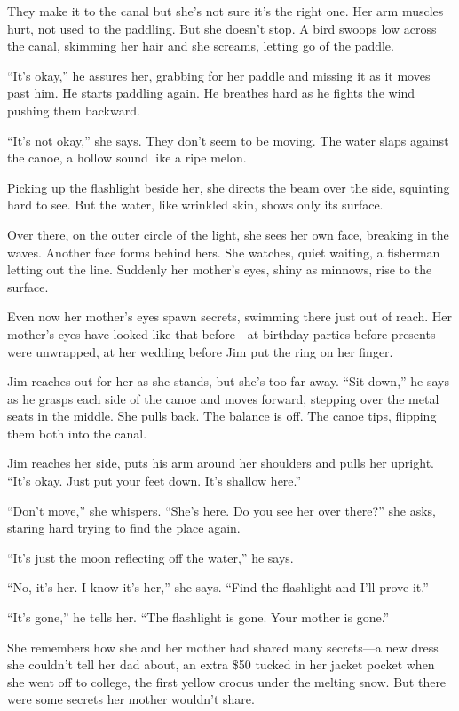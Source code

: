 \documentclass[twoside,10pt]{book}
\begin{document}
They make it to the canal but she's not sure it's the right one. Her arm
muscles hurt, not used to the paddling. But she doesn't stop. A bird
swoops low across the canal, skimming her hair and she screams, letting
go of the paddle.

``It's okay,'' he assures her, grabbing for her paddle and missing it as
it moves past him. He starts paddling again. He breathes hard as he
fights the wind pushing them backward.

``It's not okay,'' she says. They don't seem to be moving. The water
slaps against the canoe, a hollow sound like a ripe melon.

Picking up the flashlight beside her, she directs the beam over the
side, squinting hard to see. But the water, like wrinkled skin, shows
only its surface.

Over there, on the outer circle of the light, she sees her own face,
breaking in the waves. Another face forms behind hers. She watches,
quiet waiting, a fisherman letting out the line. Suddenly her mother's
eyes, shiny as minnows, rise to the surface.

Even now her mother's eyes spawn secrets, swimming there just out of
reach. Her mother's eyes have looked like that before---at birthday
parties before presents were unwrapped, at her wedding before Jim put
the ring on her finger.

Jim reaches out for her as she stands, but she's too far away. ``Sit
down,'' he says as he grasps each side of the canoe and moves forward,
stepping over the metal seats in the middle. She pulls back. The balance
is off. The canoe tips, flipping them both into the canal.

Jim reaches her side, puts his arm around her shoulders and pulls her
upright. ``It's okay. Just put your feet down. It's shallow here.''

``Don't move,'' she whispers. ``She's here. Do you see her over there?''
she asks, staring hard trying to find the place again.

``It's just the moon reflecting off the water,'' he says.

``No, it's her. I know it's her,'' she says. ``Find the flashlight and
I'll prove it.''

``It's gone,'' he tells her. ``The flashlight is gone. Your mother is
gone.''

She remembers how she and her mother had shared many secrets---a new
dress she couldn't tell her dad about, an extra \$50 tucked in her
jacket pocket when she went off to college, the first yellow crocus
under the melting snow. But there were some secrets her mother wouldn't
share.
\end{document}
